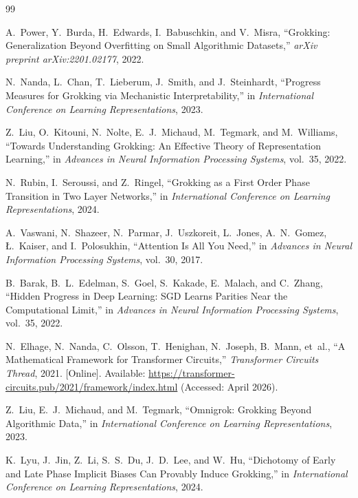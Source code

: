 \documentclass[12pt,openany,a4paper]{book}
\begin{document}
{\renewcommand{\bibname}{References}%
\begin{thebibliography}{99}

A.~Power, Y.~Burda, H.~Edwards, I.~Babuschkin, and V.~Misra,
``Grokking: Generalization Beyond Overfitting on Small Algorithmic
Datasets,'' \textit{arXiv preprint arXiv:2201.02177}, 2022.

N.~Nanda, L.~Chan, T.~Lieberum, J.~Smith, and J.~Steinhardt,
``Progress Measures for Grokking via Mechanistic Interpretability,''
in \textit{International Conference on Learning Representations}, 2023.

Z.~Liu, O.~Kitouni, N.~Nolte, E.~J.~Michaud, M.~Tegmark, and
M.~Williams, ``Towards Understanding Grokking: An Effective Theory
of Representation Learning,'' in \textit{Advances in Neural
Information Processing Systems}, vol.~35, 2022.

N.~Rubin, I.~Seroussi, and Z.~Ringel,
``Grokking as a First Order Phase Transition in Two Layer Networks,''
in \textit{International Conference on Learning Representations}, 2024.

A.~Vaswani, N.~Shazeer, N.~Parmar, J.~Uszkoreit, L.~Jones,
A.~N.~Gomez, {\L}.~Kaiser, and I.~Polosukhin,
``Attention Is All You Need,''
in \textit{Advances in Neural Information Processing Systems},
vol.~30, 2017.

B.~Barak, B.~L.~Edelman, S.~Goel, S.~Kakade, E.~Malach, and
C.~Zhang, ``Hidden Progress in Deep Learning: SGD Learns Parities
Near the Computational Limit,'' in \textit{Advances in Neural
Information Processing Systems}, vol.~35, 2022.

N.~Elhage, N.~Nanda, C.~Olsson, T.~Henighan, N.~Joseph, B.~Mann,
et~al., ``A Mathematical Framework for Transformer Circuits,''
\textit{Transformer Circuits Thread}, 2021.
[Online]. Available: \url{https://transformer-circuits.pub/2021/framework/index.html}
(Accessed: April 2026).

Z.~Liu, E.~J.~Michaud, and M.~Tegmark,
``Omnigrok: Grokking Beyond Algorithmic Data,''
in \textit{International Conference on Learning Representations}, 2023.

K.~Lyu, J.~Jin, Z.~Li, S.~S.~Du, J.~D.~Lee, and W.~Hu,
``Dichotomy of Early and Late Phase Implicit Biases Can Provably
Induce Grokking,''
in \textit{International Conference on Learning Representations}, 2024.


\end{thebibliography}}
\end{document}
